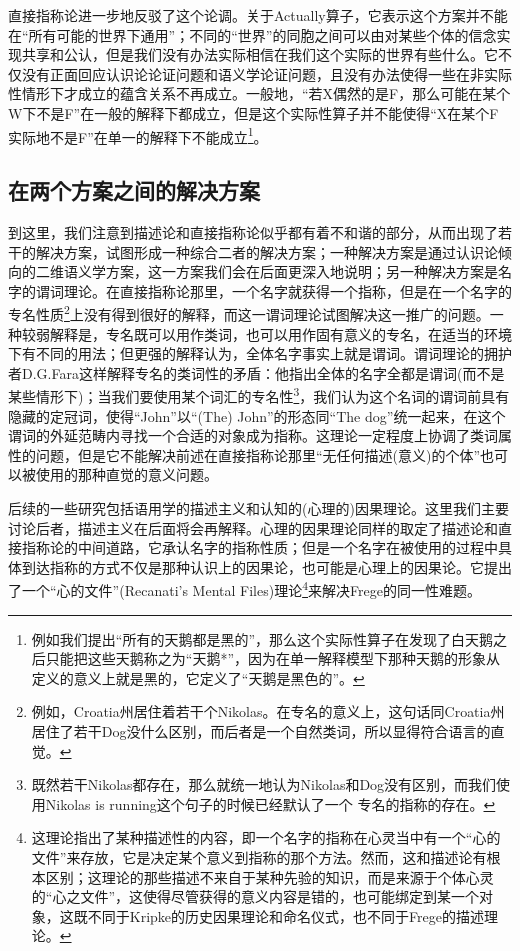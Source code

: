 \documentclass{article}
\begin{document}
直接指称论进一步地反驳了这个论调。关于Actually算子，它表示这个方案并不能在“所有可能的世界下通用”；不同的“世界”的同胞之间可以由对某些个体的信念实现共享和公认，但是我们没有办法实际相信在我们这个实际的世界有些什么。它不仅没有正面回应认识论论证问题和语义学论证问题，且没有办法使得一些在非实际性情形下才成立的蕴含关系不再成立。一般地，“若X偶然的是F，那么可能在某个W下不是F”在一般的解释下都成立，但是这个实际性算子并不能使得“X在某个F实际地不是F”在单一的解释下不能成立\footnote{例如我们提出“所有的天鹅都是黑的”，那么这个实际性算子在发现了白天鹅之后只能把这些天鹅称之为“天鹅*”，因为在单一解释模型下那种天鹅的形象从定义的意义上就是黑的，它定义了“天鹅是黑色的”。}。

\subsection{在两个方案之间的解决方案}
到这里，我们注意到描述论和直接指称论似乎都有着不和谐的部分，从而出现了若干的解决方案，试图形成一种综合二者的解决方案；一种解决方案是通过认识论倾向的二维语义学方案，这一方案我们会在后面更深入地说明；另一种解决方案是名字的谓词理论。在直接指称论那里，一个名字就获得一个指称，但是在一个名字的专名性质\footnote{例如，Croatia州居住着若干个Nikolas。在专名的意义上，这句话同Croatia州居住了若干Dog没什么区别，而后者是一个自然类词，所以显得符合语言的直觉。}上没有得到很好的解释，而这一谓词理论试图解决这一推广的问题。一种较弱解释是，专名既可以用作类词，也可以用作固有意义的专名，在适当的环境下有不同的用法；但更强的解释认为，全体名字事实上就是谓词。谓词理论的拥护者D.G.Fara这样解释专名的类词性的矛盾：他指出全体的名字全都是谓词(而不是某些情形下)；当我们要使用某个词汇的专名性\footnote{既然若干Nikolas都存在，那么就统一地认为Nikolas和Dog没有区别，而我们使用Nikolas is running这个句子的时候已经默认了一个
专名的指称的存在。}，我们认为这个名词的谓词前具有隐藏的定冠词，使得“John”以“(The) John”的形态同“The dog”统一起来，在这个谓词的外延范畴内寻找一个合适的对象成为指称。这理论一定程度上协调了类词属性的问题，但是它不能解决前述在直接指称论那里“无任何描述(意义)的个体”也可以被使用的那种直觉的意义问题。

后续的一些研究包括语用学的描述主义和认知的(心理的)因果理论。这里我们主要讨论后者，描述主义在后面将会再解释。心理的因果理论同样的取定了描述论和直接指称论的中间道路，它承认名字的指称性质；但是一个名字在被使用的过程中具体到达指称的方式不仅是那种认识上的因果论，也可能是心理上的因果论。它提出了一个“心的文件”(Recanati's Mental Files)理论\footnote{这理论指出了某种描述性的内容，即一个名字的指称在心灵当中有一个“心的文件”来存放，它是决定某个意义到指称的那个方法。然而，这和描述论有根本区别；这理论的那些描述不来自于某种先验的知识，而是来源于个体心灵的“心之文件”，这使得尽管获得的意义内容是错的，也可能绑定到某一个对象，这既不同于Kripke的历史因果理论和命名仪式，也不同于Frege的描述理论。}来解决Frege的同一性难题。
\end{document}
